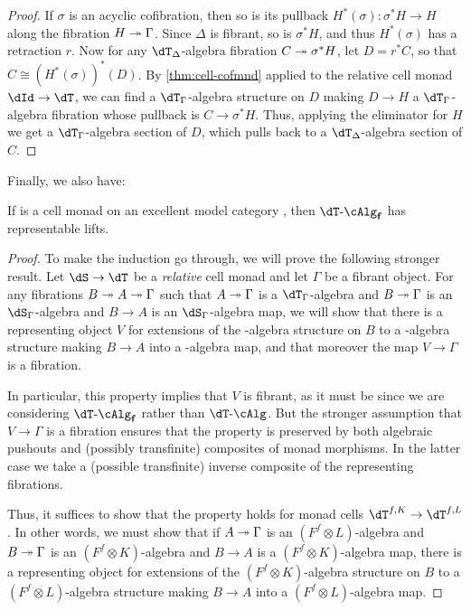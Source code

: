 \begin{enumerate}
\begin{enumerate}
\begin{proof}
  If $\sigma$ is an acyclic cofibration, then so is its pullback $H^*(\sigma) : \sigma^*H \to H$ along the fibration $H\twoheadrightarrow \Gamma$.
  Since $\Delta$ is fibrant, so is $\sigma^*H$, and thus $H^*(\sigma)$ has a retraction $r$.
  Now for any $\dT_\Delta$-algebra fibration $C\twoheadrightarrow \sigma^*H$, let $D = r^*C$, so that $C \cong (H^*(\sigma))^*(D)$.
  By \cref{thm:cell-cofmnd} applied to the relative cell monad $\dId\to\dT$, we can find a $\dT_\Gamma$-algebra structure on $D$ making $D\to H$ a $\dT_\Gamma$-algebra fibration whose pullback is $C\to\sigma^* H$.
  Thus, applying the eliminator for $H$ we get a $\dT_\Gamma$-algebra section of $D$, which pulls back to a $\dT_\Delta$-algebra section of $C$.
\end{proof}

Finally, we also have:

\begin{thm}\label{thm:cell-replift}
  If \dT is a cell monad on an excellent model category \sM, then $\dT\algf$ has representable lifts.
\end{thm}
\begin{proof}
  To make the induction go through, we will prove the following stronger result.
  Let $\dS\to\dT$ be a \emph{relative} cell monad and let $\Gamma$ be a fibrant object.
  For any fibrations $B\twoheadrightarrow A\twoheadrightarrow \Gamma$ such that $A\twoheadrightarrow \Gamma$ is a $\dT_\Gamma$-algebra and $B\twoheadrightarrow\Gamma$ is an $\dS_\Gamma$-algebra and $B\to A$ is an $\dS_\Gamma$-algebra map, we will show that there is a representing object $V$ for extensions of the \dS-algebra structure on $B$ to a \dT-algebra structure making $B\to A$ into a \dT-algebra map, and that moreover the map $V\to\Gamma$ is a fibration.

  In particular, this property implies that $V$ is fibrant, as it must be since we are considering $\dT\algf$ rather than $\dT\alg$.
  But the stronger assumption that $V\to\Gamma$ is a fibration ensures that the property is preserved by both algebraic pushouts and (possibly transfinite) composites of monad morphisms.
  In the latter case we take a (possible transfinite) inverse composite of the representing fibrations.

  Thus, it suffices to show that the property holds for monad cells $\dT^{f,K} \to \dT^{f,L}$.
  In other words, we must show that if $A\twoheadrightarrow \Gamma$ is an $(F^f\otimes L)$-algebra and $B\twoheadrightarrow\Gamma$ is an $(F^f\otimes K)$-algebra and $B\to A$ is a $(F^f\otimes K)$-algebra map, there is a representing object for extensions of the $(F^f\otimes K)$-algebra structure on $B$ to a $(F^f\otimes L)$-algebra structure making $B\to A$ into a $(F^f\otimes L)$-algebra map.


\end{proof}
\end{enumerate}
\end{enumerate}

